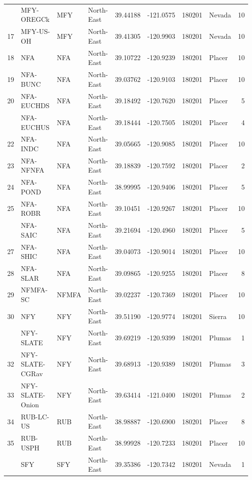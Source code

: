 \documentclass[proquest,12pt,final]{ucthesis-CA2012} %
\begin{document}
\begin{ucmainmatter}
\begin{longtable}[t]{r>{\raggedright\arraybackslash}p{9em}llrrr>{\raggedright\arraybackslash}p{5em}r}
\addlinespace
16 & MFY-OREGCk & MFY & North-East & 39.44188 & -121.0575 & 180201 & Nevada & 10\\
17 & MFY-US-OH & MFY & North-East & 39.41305 & -120.9903 & 180201 & Nevada & 10\\
18 & NFA & NFA & North-East & 39.10722 & -120.9239 & 180201 & Placer & 10\\
19 & NFA-BUNC & NFA & North-East & 39.03762 & -120.9103 & 180201 & Placer & 10\\
20 & NFA-EUCHDS & NFA & North-East & 39.18492 & -120.7620 & 180201 & Placer & 5\\
\addlinespace
21 & NFA-EUCHUS & NFA & North-East & 39.18444 & -120.7505 & 180201 & Placer & 4\\
22 & NFA-INDC & NFA & North-East & 39.05665 & -120.9085 & 180201 & Placer & 10\\
23 & NFA-NFNFA & NFA & North-East & 39.18839 & -120.7592 & 180201 & Placer & 2\\
24 & NFA-POND & NFA & North-East & 38.99995 & -120.9406 & 180201 & Placer & 5\\
25 & NFA-ROBR & NFA & North-East & 39.10451 & -120.9267 & 180201 & Placer & 10\\
\addlinespace
26 & NFA-SAIC & NFA & North-East & 39.21694 & -120.4960 & 180201 & Placer & 5\\
27 & NFA-SHIC & NFA & North-East & 39.04073 & -120.9014 & 180201 & Placer & 10\\
28 & NFA-SLAR & NFA & North-East & 39.09865 & -120.9255 & 180201 & Placer & 8\\
29 & NFMFA-SC & NFMFA & North-East & 39.02237 & -120.7369 & 180201 & Placer & 10\\
30 & NFY & NFY & North-East & 39.51190 & -120.9774 & 180201 & Sierra & 10\\
\addlinespace
31 & NFY-SLATE & NFY & North-East & 39.69219 & -120.9399 & 180201 & Plumas & 1\\
32 & NFY-SLATE-CGRav & NFY & North-East & 39.68913 & -120.9389 & 180201 & Plumas & 3\\
33 & NFY-SLATE-Onion & NFY & North-East & 39.63414 & -121.0400 & 180201 & Plumas & 2\\
34 & RUB-LC-US & RUB & North-East & 38.98887 & -120.6900 & 180201 & Placer & 8\\
35 & RUB-USPH & RUB & North-East & 38.99928 & -120.7233 & 180201 & Placer & 10\\
\addlinespace
36 & SFY & SFY & North-East & 39.35386 & -120.7342 & 180201 & Nevada & 1\\

\end{longtable}
\end{ucmainmatter}
\end{document}
